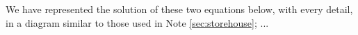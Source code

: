 We have represented the solution of these two equations below, with every detail, in a diagram similar to those used in Note \ref{sec:storehouse}; ...
